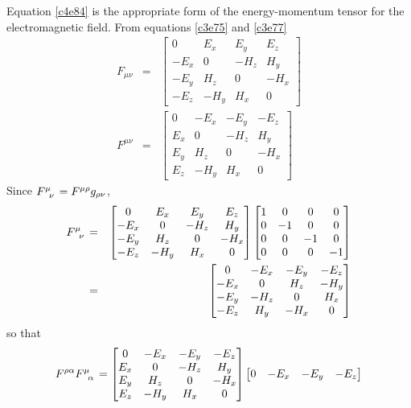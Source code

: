 \begin{enumerate}
Equation \eqref{c4e84} is the appropriate form of the energy-momentum tensor for
the electromagnetic field.
From equations \eqref{c3e75} and \eqref{c3e77}
\begin{eqnarray*}
F_{\mu\nu} &=& \begin{bmatrix} 0 & E_x & E_y & E_z \\
-E_x & 0 & -H_z & H_y \\
-E_y & H_z & 0 & -H_x \\
-E_z & -H_y & H_x & 0
\end{bmatrix} \\
F^{\mu\nu} &=& \begin{bmatrix} 0 & -E_x & -E_y & -E_z \\
E_x & 0 & -H_z & H_y \\
E_y & H_z & 0 & -H_x \\
E_z & -H_y & H_x & 0
\end{bmatrix}
\end{eqnarray*}
Since $\tensor{F}{^\mu_\nu} = F^{\mu\rho}g_{\rho\nu}$,
\begin{eqnarray}
\tensor{F}{^\mu_\nu} &=& \begin{bmatrix} 0 & E_x & E_y & E_z \\
-E_x & 0 & -H_z & H_y \\
-E_y & H_z & 0 & -H_x \\
-E_z & -H_y & H_x & 0
\end{bmatrix}\begin{bmatrix}1 & 0 & 0 & 0 \\
0 & -1 & 0 & 0 \\
0 & 0 & -1 & 0 \\
0 & 0 & 0 & -1
\end{bmatrix} \nonumber \\
 &=& \begin{bmatrix}0 & -E_x & -E_y & -E_z \\
 -E_x & 0 & H_z & -H_y \\
 -E_y & -H_z & 0 & H_x \\
 -E_z & H_y & -H_x & 0 
 \end{bmatrix} \label{c4e85}
\end{eqnarray}
so that
\[
F^{\rho\alpha}\tensor{F}{^\mu_\alpha} = \begin{bmatrix}
0 & -E_x & -E_y & -E_z \\
E_x & 0 & -H_z & H_y \\
E_y & H_z & 0 & -H_x \\
E_z & -H_y & H_x & 0
\end{bmatrix}\begin{bmatrix}0 & -E_x & -E_y & -E_z \\

\end{bmatrix}\]
\end{enumerate}
